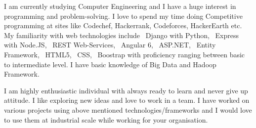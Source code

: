 \documentclass[11pt, a4paper]{awesome-cv} %
\begin{document}
\makecvheader %

\makelettertitle %


\begin{cvletter}



I am currently studying Computer Engineering and I have a huge interest in programming and problem-solving. I love to spend my time doing Competitive programming at sites like Codechef, Hackerrank, Codeforces, HackerEarth etc.
My familiarity with web technologies include ~Django with Python, ~Express with Node.JS, ~REST Web-Services, ~Angular 6, ~ASP.NET, ~Entity Framework, ~HTML5, ~CSS, ~Boostrap with proficiency ranging between basic to intermediate level.
I have basic knowledge of Big Data and Hadoop Framework.



I am highly enthusiastic individual with always ready to learn and never give up attitude. I like exploring new ideas and love to work in a team. I have worked on various projects using above mentioned technologies/frameworks and I would love to use them at industrial scale while working for your organisation.


\end{cvletter}


\makeletterclosing %
\end{document}
